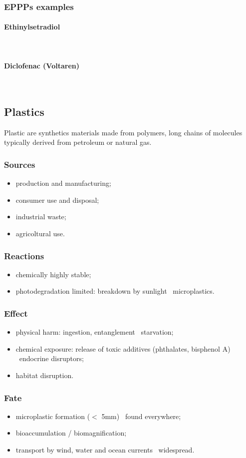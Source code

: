 \documentclass{article}
\newcommand{\pph}[1]{\paragraph{#1}\phantom{}\\}
\begin{document}
\subsubsection{EPPPs examples}

\pph{Ethinylsetradiol}


\pph{Diclofenac (Voltaren)}

\newpage
\subsection{Plastics}
Plastic are synthetics materials made from polymers, long chains of molecules typically
derived from petroleum or natural gas.

\subsubsection{Sources}
\begin{itemize}
    \item production and manufacturing;
    \item consumer use and disposal;
    \item industrial waste;
    \item agricoltural use.
\end{itemize}

\subsubsection{Reactions}
\begin{itemize}
    \item chemically highly stable;
    \item photodegradation limited: breakdown by sunlight \textrightarrow\ microplastics.
\end{itemize}

\subsubsection{Effect}
\begin{itemize}
    \item physical harm: ingestion, entanglement \textrightarrow\ starvation;
    \item chemical exposure: release of toxic additives (phthalates, bisphenol A) \textrightarrow\ endocrine disruptors;
    \item habitat disruption.
\end{itemize}

\subsubsection{Fate}
\begin{itemize}
    \item microplastic formation ($<$ 5mm) \textrightarrow\ found everywhere;
    \item bioaccumulation / biomagnification;
    \item transport by wind, water and ocean currents \textrightarrow\ widespread.
\end{itemize}
\end{document}
